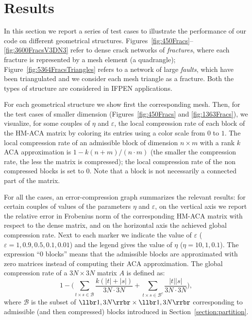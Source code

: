 


\section{Results}

In this section we report a series of test cases to illustrate the performance of our code on different geometrical structures.
Figures~\ref{fig:450Fracs}--\ref{fig:3600FracsV3DN3} refer to dense crack networks of \emph{fractures}, where each fracture is represented by a mesh element (a quadrangle);    
Figure~\ref{fig:5364FracsTriangles} refers to a network of large \emph{faults}, which have been triangulated and we consider each mesh triangle as a fracture. Both the types of structure are considered in IFPEN applications.

For each geometrical structure we show first the corresponding mesh.
Then, for the test cases of smaller dimension (Figures~\ref{fig:450Fracs} and \ref{fig:1363Fracs}), we visualize, for some couples of $\eta$ and $\varepsilon$, the local compression rate of each block of the HM-ACA matrix by coloring its entries using a color scale from $0$ to $1$. The local compression rate of an admissible block of dimension $n\times m$ with a rank $k$ ACA approximation is $1-k(n+m)/(n\cdot m)$ (the smaller the compression rate, the less the matrix is compressed); the local compression rate of the non compressed blocks is set to $0$. Note that a block is not necessarily a connected part of the matrix.

For all the cases, an error-compression graph summarizes the relevant results: for certain couples of values of the parameters $\eta$ and $\varepsilon$, on the vertical axis we report the relative error in Frobenius norm of the corresponding HM-ACA matrix with respect to the dense matrix, and on the horizontal axis the achieved global compression rate. Next to each marker we indicate the value of $\varepsilon$ ($\varepsilon=1, 0.9, 0.5, 0.1, 0.01$) and the legend gives the value of $\eta$ ($\eta=10,1,0.1$). The expression ``0 blocks'' means that the admissible blocks are approximated with zero matrices instead of computing their ACA approximation.
The global compression rate of a $3N\times 3N$ matrix $A$ is defined as:
\[
1- \Biggl(\sum_{t \times s \in \mathscr{B}}{\frac{k(\lvert t \rvert + \lvert s \rvert)}{3N\cdot3N} } + 
\sum_{t \times s \in \mathscr{B}^c}{\frac{\lvert t \rvert \lvert s \rvert}{3N\cdot3N} } \Biggr),
\]
where $\mathscr{B}$ is the subset of $\llbr 1,3N\rrbr\times \llbr 1,3N\rrbr$ corresponding to admissible (and then compressed) blocks introduced in Section~\ref{section:partition}.

